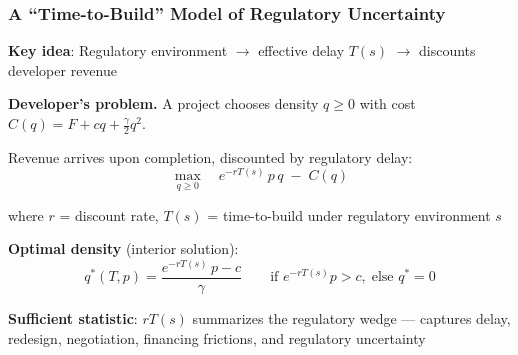 \begin{frame}
	\frametitle{A ``Time-to-Build'' Model of Regulatory Uncertainty}
	\small
	\textbf{Key idea}: Regulatory environment $\rightarrow$ effective delay $T(s)$ $\rightarrow$ discounts developer revenue

	\vspace{0.5em}
	\textbf{Developer's problem.} A project chooses density $q \geq 0$ with cost $C(q) = F + cq + \frac{\gamma}{2}q^2$.
	\vspace{0.2em}

	Revenue arrives upon completion, discounted by regulatory delay:
	\vspace{-0.3em}
	\[
		\max_{q \geq 0} \quad e^{-rT(s)}\, p\, q \;-\; C(q)
	\]
	\vspace{-0.8em}

	where $r$ = discount rate, $T(s)$ = time-to-build under regulatory environment $s$

	\vspace{0.5em}
	\textbf{Optimal density} (interior solution):
	\vspace{-0.3em}
	\[
		q^*(T, p) = \frac{e^{-rT(s)}\, p - c}{\gamma} \qquad \text{if } e^{-rT(s)} p > c, \;\text{else } q^* = 0
	\]
	\vspace{-0.5em}

	\textbf{Sufficient statistic}: $rT(s)$ summarizes the regulatory wedge --- captures delay, redesign, negotiation, financing frictions, and regulatory uncertainty
\end{frame}


